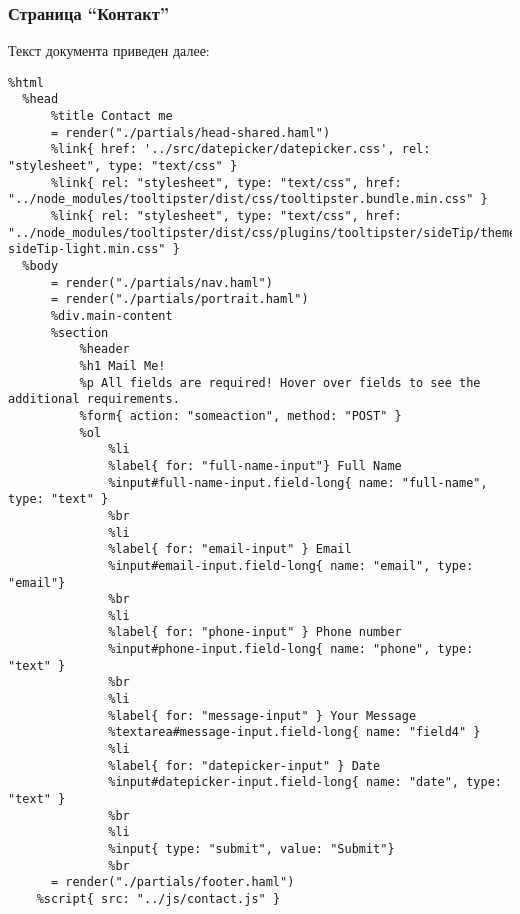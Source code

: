 \documentclass[a4paper,14pt]{extarticle}
\begin{document}
\subsubsection{Страница \enquote{Контакт}}
Текст документа  приведен далее:
\begin{lstlisting}
%html
  %head
      %title Contact me
      = render("./partials/head-shared.haml")
      %link{ href: '../src/datepicker/datepicker.css', rel: "stylesheet", type: "text/css" }
      %link{ rel: "stylesheet", type: "text/css", href: "../node_modules/tooltipster/dist/css/tooltipster.bundle.min.css" }
      %link{ rel: "stylesheet", type: "text/css", href: "../node_modules/tooltipster/dist/css/plugins/tooltipster/sideTip/themes/tooltipster-sideTip-light.min.css" }
  %body
      = render("./partials/nav.haml")
      = render("./partials/portrait.haml")
      %div.main-content
      %section
          %header
          %h1 Mail Me!
          %p All fields are required! Hover over fields to see the additional requirements.
          %form{ action: "someaction", method: "POST" }
          %ol
              %li
              %label{ for: "full-name-input"} Full Name
              %input#full-name-input.field-long{ name: "full-name", type: "text" }
              %br
              %li
              %label{ for: "email-input" } Email
              %input#email-input.field-long{ name: "email", type: "email"}
              %br
              %li
              %label{ for: "phone-input" } Phone number
              %input#phone-input.field-long{ name: "phone", type: "text" }
              %br
              %li
              %label{ for: "message-input" } Your Message
              %textarea#message-input.field-long{ name: "field4" }
              %li
              %label{ for: "datepicker-input" } Date
              %input#datepicker-input.field-long{ name: "date", type: "text" }
              %br
              %li
              %input{ type: "submit", value: "Submit"}
              %br  
      = render("./partials/footer.haml")
    %script{ src: "../js/contact.js" }
\end{lstlisting}
\end{document}
